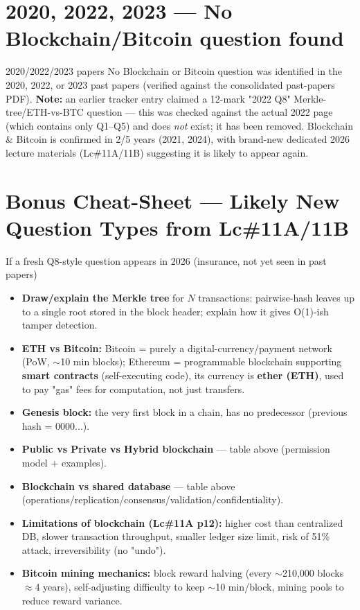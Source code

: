 \documentclass[12pt,a4paper]{article}
\begin{document}
\section*{2020, 2022, 2023 --- No Blockchain/Bitcoin question found}
\begin{warnbox}{2020/2022/2023 papers}
No Blockchain or Bitcoin question was identified in the 2020, 2022, or 2023 past papers (verified against the consolidated past-papers PDF). \textbf{Note:} an earlier tracker entry claimed a 12-mark "2022 Q8" Merkle-tree/ETH-vs-BTC question --- this was checked against the actual 2022 page (which contains only Q1--Q5) and does \emph{not} exist; it has been removed. Blockchain \& Bitcoin is confirmed in 2/5 years (2021, 2024), with brand-new dedicated 2026 lecture materials (Lc\#11A/11B) suggesting it is likely to appear again.
\end{warnbox}

\section*{Bonus Cheat-Sheet --- Likely New Question Types from Lc\#11A/11B}
\begin{keybox}{If a fresh Q8-style question appears in 2026 (insurance, not yet seen in past papers)}
\begin{itemize}[noitemsep]
  \item \textbf{Draw/explain the Merkle tree} for $N$ transactions: pairwise-hash leaves up to a single root stored in the block header; explain how it gives O(1)-ish tamper detection.
  \item \textbf{ETH vs Bitcoin:} Bitcoin = purely a digital-currency/payment network (PoW, $\sim$10 min blocks); Ethereum = programmable blockchain supporting \textbf{smart contracts} (self-executing code), its currency is \textbf{ether (ETH)}, used to pay "gas" fees for computation, not just transfers.
  \item \textbf{Genesis block:} the very first block in a chain, has no predecessor (previous hash = 0000...).
  \item \textbf{Public vs Private vs Hybrid blockchain} --- table above (permission model + examples).
  \item \textbf{Blockchain vs shared database} --- table above (operations/replication/consensus/validation/confidentiality).
  \item \textbf{Limitations of blockchain (Lc\#11A p12):} higher cost than centralized DB, slower transaction throughput, smaller ledger size limit, risk of 51\% attack, irreversibility (no "undo").
  \item \textbf{Bitcoin mining mechanics:} block reward halving (every $\sim$210{,}000 blocks $\approx$4 years), self-adjusting difficulty to keep $\sim$10 min/block, mining pools to reduce reward variance.
\end{itemize}
\end{keybox}
\end{document}
